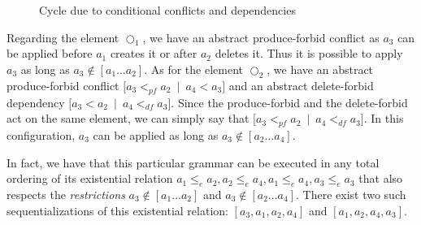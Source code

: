 \begin{example}
\begin{figure}[!ht]
  \centering
  \caption{Cycle due to conditional conflicts and dependencies}\label{fig:process:order:cycle}
\end{figure}

  Regarding the element $\Circle_1$, we have an abstract produce-forbid conflict as $a_3$ can be applied before $a_1$ creates it or after $a_2$ deletes it. Thus it is possible to apply $a_3$ as long as $a_3 \not\in [a_1\ldots a_2]$. As for the element $\Circle_2$, we have an abstract produce-forbid conflict \mbox{$[a_3 <_{pf} a_2$ $|$ $a_4 < a_3]$} and an abstract delete-forbid dependency \mbox{$[a_3 < a_2$ $|$ $a_4 <_{df} a_3]$}. Since the produce-forbid and the delete-forbid act on the same element, we can simply say that \mbox{$[a_3 <_{pf} a_2$ $|$ $a_4 <_{df} a_3]$}. In this configuration, $a_3$ can be applied as long as $a_3 \not\in [a_2\ldots a_4]$.

  In fact, we have that this particular grammar can be executed in any total ordering of its existential relation $a_1 \leq_e a_2, a_2 \leq_e a_4, a_1 \leq_e a_4, a_3 \leq_e a_3$ that also respects the \emph{restrictions} $a_3 \not\in [a_1\ldots a_2]$ and $a_3 \not\in [a_2\ldots a_4]$. There exist two such sequentializations of this existential relation: $[a_3, a_1, a_2, a_4]$ and $[a_1,a_2,a_4,a_3]$.
\end{example}

